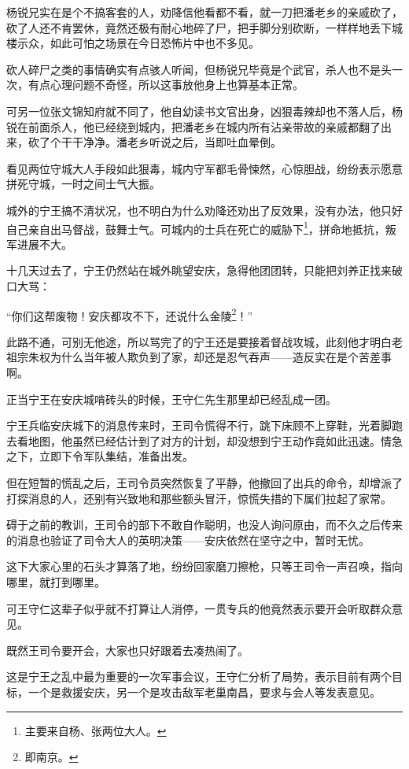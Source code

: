 \begin{multicols}{\theparacolNo}
		杨锐兄实在是个不搞客套的人，劝降信他看都不看，就一刀把潘老乡的亲戚砍了，砍了人还不肯罢休，竟然还极有耐心地碎了尸，把手脚分别砍断，一样样地丢下城楼示众，如此可怕之场景在今日恐怖片中也不多见。

		砍人碎尸之类的事情确实有点骇人听闻，但杨锐兄毕竟是个武官，杀人也不是头一次，有点心理问题不奇怪，所以这事放他身上也算基本正常。

		可另一位张文锦知府就不同了，他自幼读书文官出身，凶狠毒辣却也不落人后，杨锐在前面杀人，他已经绕到城内，把潘老乡在城内所有沾亲带故的亲戚都翻了出来，砍了个干干净净。潘老乡听说之后，当即吐血晕倒。

		看见两位守城大人手段如此狠毒，城内守军都毛骨悚然，心惊胆战，纷纷表示愿意拼死守城，一时之间士气大振。

		城外的宁王搞不清状况，也不明白为什么劝降还劝出了反效果，没有办法，他只好自己亲自出马督战，鼓舞士气。可城内的士兵在死亡的威胁下\footnote{主要来自杨、张两位大人。}，拼命地抵抗，叛军进展不大。

		十几天过去了，宁王仍然站在城外眺望安庆，急得他团团转，只能把刘养正找来破口大骂：

		“你们这帮废物！安庆都攻不下，还说什么金陵\footnote{即南京。}！”

		此路不通，可别无他途，所以骂完了的宁王还是要接着督战攻城，此刻他才明白老祖宗朱权为什么当年被人欺负到了家，却还是忍气吞声——造反实在是个苦差事啊。

		正当宁王在安庆城啃砖头的时候，王守仁先生那里却已经乱成一团。

		宁王兵临安庆城下的消息传来时，王司令慌得不行，跳下床顾不上穿鞋，光着脚跑去看地图，他虽然已经估计到了对方的计划，却没想到宁王动作竟如此迅速。情急之下，立即下令军队集结，准备出发。

		但在短暂的慌乱之后，王司令员突然恢复了平静，他撤回了出兵的命令，却增派了打探消息的人，还别有兴致地和那些额头冒汗，惊慌失措的下属们拉起了家常。

		碍于之前的教训，王司令的部下不敢自作聪明，也没人询问原由，而不久之后传来的消息也验证了司令大人的英明决策——安庆依然在坚守之中，暂时无忧。

		这下大家心里的石头才算落了地，纷纷回家磨刀擦枪，只等王司令一声召唤，指向哪里，就打到哪里。

		可王守仁这辈子似乎就不打算让人消停，一贯专兵的他竟然表示要开会听取群众意见。

		既然王司令要开会，大家也只好跟着去凑热闹了。

		这是宁王之乱中最为重要的一次军事会议，王守仁分析了局势，表示目前有两个目标，一个是救援安庆，另一个是攻击敌军老巢南昌，要求与会人等发表意见。


\end{multicols}
